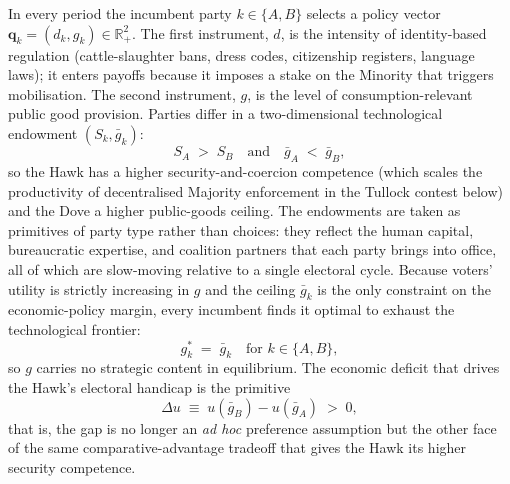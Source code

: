 \documentclass[11pt,twoside]{extarticle}
\begin{document}
In every period the incumbent party $k\in\{A,B\}$ selects a policy vector $\mathbf{q}_k=(d_k,g_k)\in\mathbb{R}_+^2$. The first instrument, $d$, is the intensity of identity-based regulation (cattle-slaughter bans, dress codes, citizenship registers, language laws); it enters payoffs because it imposes a stake on the Minority that triggers mobilisation. The second instrument, $g$, is the level of consumption-relevant public good provision. Parties differ in a two-dimensional technological endowment $(S_k,\bar g_k)$:
\begin{equation}\label{eq:party_endowment_v2}
    S_A \;>\; S_B \quad\text{and}\quad \bar g_A \;<\; \bar g_B,
\end{equation}
so the Hawk has a higher security-and-coercion competence (which scales the productivity of decentralised Majority enforcement in the Tullock contest below) and the Dove a higher public-goods ceiling. The endowments are taken as primitives of party type rather than choices: they reflect the human capital, bureaucratic expertise, and coalition partners that each party brings into office, all of which are slow-moving relative to a single electoral cycle. Because voters' utility is strictly increasing in $g$ and the ceiling $\bar g_k$ is the only constraint on the economic-policy margin, every incumbent finds it optimal to exhaust the technological frontier:
\begin{equation}\label{eq:g_corner_v2}
    g_k^*\;=\;\bar g_k\quad\text{for }k\in\{A,B\},
\end{equation}
so $g$ carries no strategic content in equilibrium. The economic deficit that drives the Hawk's electoral handicap is the primitive
\begin{equation}\label{eq:du_v2}
    \Delta u\;\equiv\;u(\bar g_B)-u(\bar g_A)\;>\;0,
\end{equation}
that is, the gap is no longer an \emph{ad hoc} preference assumption but the other face of the same comparative-advantage tradeoff that gives the Hawk its higher security competence.
\end{document}
